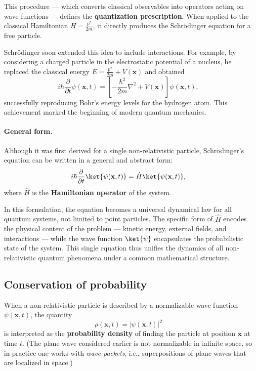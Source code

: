 This procedure --- which converts classical observables into operators acting on wave functions --- defines the \textbf{quantization prescription}.
When applied to the classical Hamiltonian \(H = \frac{p^2}{2m}\), it directly produces the Schrödinger equation for a free particle.

Schrödinger soon extended this idea to include interactions.
For example, by considering a charged particle in the electrostatic potential of a nucleus, he replaced the classical energy \(E = \frac{p^2}{2m} + V(\mathbf{x})\) and obtained
\[
    i\hbar \frac{\partial}{\partial t} \psi(\mathbf{x},t)
    = \left[-\frac{\hbar^2}{2m}\nabla^2 + V(\mathbf{x})\right]\psi(\mathbf{x},t),
\]
successfully reproducing Bohr’s energy levels for the hydrogen atom.
This achievement marked the beginning of modern quantum mechanics.

\paragraph{General form.}
Although it was first derived for a single non-relativistic particle, Schrödinger’s equation can be written in a general and abstract form:
\begin{equation}
    i\hbar \frac{\partial}{\partial t} \ket{\psi(\mathbf{x},t)}
    = \hat{H} \ket{\psi(\mathbf{x},t)},
    \label{eq:Schrödinger_general}
\end{equation}
where \(\hat{H}\) is the \textbf{Hamiltonian operator} of the system.

In this formulation, the equation becomes a universal dynamical law for all quantum systems, not limited to point particles.
The specific form of \(\hat{H}\) encodes the physical content of the problem — kinetic energy, external fields, and interactions — while the wave function \(\ket{\psi}\) encapsulates the probabilistic state of the system.
This single equation thus unifies the dynamics of all non-relativistic quantum phenomena under a common mathematical structure.

\subsection{Conservation of probability}

When a non-relativistic particle is described by a normalizable wave function $\psi(\mathbf{x},t)$, the quantity
\[
    \rho(\mathbf{x},t) = |\psi(\mathbf{x},t)|^2
\]
is interpreted as the \textbf{probability density} of finding the particle at position $\mathbf{x}$ at time $t$.
(The plane wave considered earlier is not normalizable in infinite space, so in practice one works with \emph{wave packets}, i.e., superpositions of plane waves that are localized in space.)

